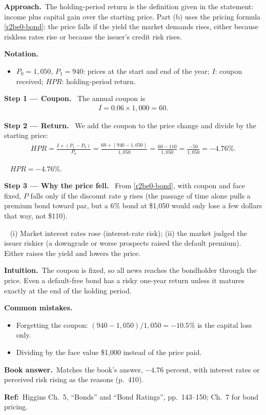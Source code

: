\documentclass[11pt,a4paper]{article}
\newcommand{\notation}{\par\noindent\textbf{Notation.}}
\newcommand{\step}[2]{\par\medskip\noindent\textbf{Step #1 --- #2.}~}
\newcommand{\intuition}{\par\medskip\noindent\textbf{Intuition.}~}
\newcommand{\bookans}{\par\medskip\noindent\textbf{Book answer.}~}
\newcommand{\refbib}{\par\smallskip\noindent\textbf{Ref:}~}
\newcommand{\approach}{\par\smallskip\noindent\textbf{Approach.}~}
\newcommand{\answer}[1]{\par\smallskip\noindent\fbox{\textbf{Answer #1.}}~}
\newcommand{\pitfalls}{\par\medskip\noindent\textbf{Common mistakes.}}
\begin{document}
\approach The holding-period return is the definition given in the statement: income plus capital gain
over the starting price. Part (b) uses the pricing formula \eqref{r2be0-bond}: the price falls if the
yield the market demands rises, either because riskless rates rise or because the issuer's credit risk rises.

\notation
\begin{itemize}
  \item $P_0=1{,}050$, $P_1=940$: prices at the start and end of the year; $I$: coupon received; $HPR$: holding-period return.
\end{itemize}

\step{1}{Coupon} The annual coupon is
\begin{align}
  I = 0.06\times 1{,}000 = 60. \label{r2be2-I}
\end{align}

\step{2}{Return} We add the coupon to the price change and divide by the starting price:
\begin{align}
  HPR = \frac{I + (P_1-P_0)}{P_0} = \frac{60 + (940-1{,}050)}{1{,}050} = \frac{60-110}{1{,}050} = \frac{-50}{1{,}050} = -4.76\%. \label{r2be2-hpr}
\end{align}
\answer{(a)} $HPR=-4.76\%$.

\step{3}{Why the price fell} From \eqref{r2be0-bond}, with coupon and face fixed, $P$ falls only if the
discount rate $y$ rises (the passage of time alone pulls a premium bond toward par, but a 6\% bond at
\$1,050 would only lose a few dollars that way, not \$110).
\answer{(b)} (i) Market interest rates rose (interest-rate risk); (ii) the market judged the issuer riskier
(a downgrade or worse prospects raised the default premium). Either raises the yield and lowers the price.

\intuition The coupon is fixed, so all news reaches the bondholder through the price. Even a default-free
bond has a risky one-year return unless it matures exactly at the end of the holding period.
\pitfalls
\begin{itemize}
  \item Forgetting the coupon: $(940-1{,}050)/1{,}050=-10.5\%$ is the capital loss only.
  \item Dividing by the face value \$1,000 instead of the price paid.
\end{itemize}
\bookans Matches the book's answer, $-4.76$ percent, with interest rates or perceived risk rising as the reasons (p.~410).
\refbib{Higgins Ch.~5, ``Bonds'' and ``Bond Ratings'', pp.~143--150; Ch.~7 for bond pricing.}
\end{document}
